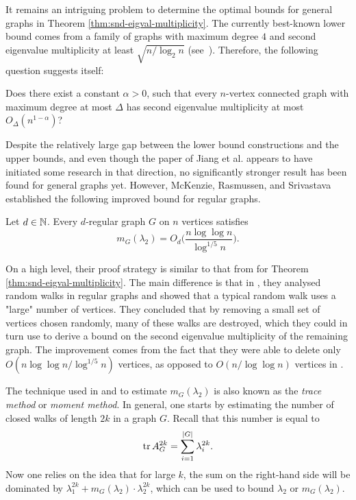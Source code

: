 It remains an intriguing problem to determine the optimal bounds for general graphs in Theorem \ref{thm:snd-eigval-multiplicity}.
The currently best-known lower bound comes from a family of graphs with maximum degree $4$ and second eigenvalue multiplicity at least $\sqrt{n / \log_2 n}$ \mbox{(see \cite{snd-eigval-lower-construction}).}
Therefore, the following question suggests itself:
\begin{question}
    Does there exist a constant $\alpha > 0$, such that every $n$-vertex connected graph with maximum degree at most $\Delta$ has second eigenvalue multiplicity at most \mbox{$O_\Delta (n^{1 - \alpha})$}?
\end{question}
Despite the relatively large gap between the lower bound constructions and the upper bounds, and even though the paper of Jiang et al. \cite{equiangular} appears to have initiated some research in that direction, no significantly stronger result has been found for general graphs yet.
However, McKenzie, Rasmussen, and Srivastava \cite{mckenzie2023supportclosedwalkssecond} established the following improved bound for regular graphs.
\begin{theorem}
    Let $d \in \mathbb{N}$. Every $d$-regular graph $G$ on $n$ vertices satisfies
    \begin{equation*}
        m_G (\lambda_2) = O_d \bigg( \frac{n \log \log n }{\log ^{1/5} n}\bigg).
    \end{equation*}
\end{theorem}

On a high level, their proof strategy is similar to that from \cite{equiangular} for Theorem \ref{thm:snd-eigval-multiplicity}. 
The main difference is that in \cite{mckenzie2023supportclosedwalkssecond}, they analysed random walks in regular graphs and showed that a typical random walk uses a "large" number of vertices. 
They concluded that by removing a small set of vertices chosen randomly, many of these walks are destroyed, which they could in turn use to derive a bound on the second eigenvalue multiplicity of the remaining graph.
The improvement comes from the fact that they were able to delete only $O (n \log \log n / \log ^{1/5} n)$ vertices, as opposed to $O(n / \log \log n)$ vertices in \cite{equiangular}.

The technique used in \cite{equiangular} and \cite{mckenzie2023supportclosedwalkssecond} to estimate $m_G(\lambda_2)$ is also known as the \textit{trace method} or \textit{moment method}. 
In general, one starts by estimating the number of closed walks of length $2k$ in a graph $G$. 
Recall that this number is equal to 
\begin{equation*}
    \operatorname{tr} A_G^{2k} = \sum_{i = 1}^{|G|} \lambda_i^{2k}.
\end{equation*}
Now one relies on the idea that for large $k$, the sum on the right-hand side will be dominated by $\lambda_1^{2k} + m_G(\lambda_2) \cdot \lambda_2^{2k}$, which can be used to bound $\lambda_2$ or $m_G (\lambda_2)$.

